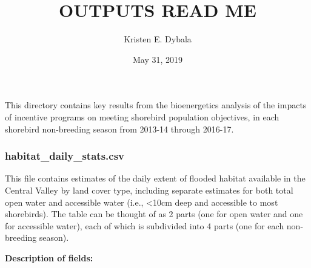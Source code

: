 \documentclass[]{article}
\title{OUTPUTS READ ME}
\author{Kristen E. Dybala}
\date{May 31, 2019}
\begin{document}
\maketitle

This directory contains key results from the bioenergetics analysis of
the impacts of incentive programs on meeting shorebird population
objectives, in each shorebird non-breeding season from 2013-14 through
2016-17.

\subsubsection{habitat\_daily\_stats.csv}\label{habitat_daily_stats.csv}

This file contains estimates of the daily extent of flooded habitat
available in the Central Valley by land cover type, including separate
estimates for both total open water and accessible water (i.e.,
\textless{}10cm deep and accessible to most shorebirds). The table can
be thought of as 2 parts (one for open water and one for accessible
water), each of which is subdivided into 4 parts (one for each
non-breeding season).

\textbf{Description of fields:}
\end{document}
